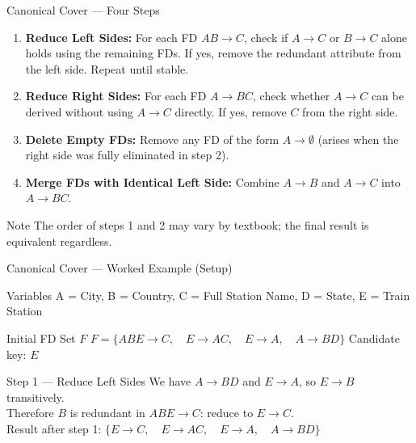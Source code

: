 \begin{frame}{Canonical Cover --- Four Steps}
  \begin{enumerate}
    \item \textbf{Reduce Left Sides:}
          For each FD $AB \to C$, check if $A \to C$ or $B \to C$ alone holds
          using the remaining FDs.  If yes, remove the redundant attribute from
          the left side.  Repeat until stable.

    \vspace{4pt}
    \item \textbf{Reduce Right Sides:}
          For each FD $A \to BC$, check whether $A \to C$ can be derived
          without using $A \to C$ directly.  If yes, remove $C$ from the right
          side.

    \vspace{4pt}
    \item \textbf{Delete Empty FDs:}
          Remove any FD of the form $A \to \emptyset$ (arises when the right
          side was fully eliminated in step 2).

    \vspace{4pt}
    \item \textbf{Merge FDs with Identical Left Side:}
          Combine $A \to B$ and $A \to C$ into $A \to BC$.
  \end{enumerate}

  \vspace{4pt}
  \begin{alertblock}{Note}
    The order of steps 1 and 2 may vary by textbook; the final result is
    equivalent regardless.
  \end{alertblock}
\end{frame}

\begin{frame}{Canonical Cover --- Worked Example (Setup)}
  \begin{block}{Variables}
    A = City, \; B = Country, \; C = Full Station Name,
    D = State, \; E = Train Station
  \end{block}

  \begin{block}{Initial FD Set $F$}
    $F = \{ABE \to C, \quad E \to AC, \quad E \to A, \quad A \to BD\}$
    \hfill Candidate key: $E$
  \end{block}

  \begin{block}{Step 1 --- Reduce Left Sides}
    We have $A \to BD$ and $E \to A$, so $E \to B$ transitively.\\
    Therefore $B$ is redundant in $ABE \to C$: reduce to $E \to C$.\\[4pt]
    Result after step 1: \quad
    $\{E \to C, \quad E \to AC, \quad E \to A, \quad A \to BD\}$
  \end{block}
\end{frame}

